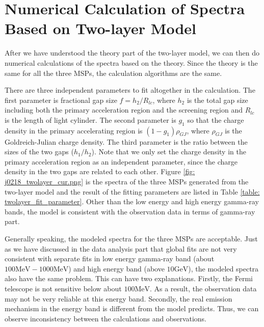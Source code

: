 \documentclass[12pt]{report}
\begin{document}
      

      \section{Numerical Calculation of Spectra Based on Two-layer Model}
        After we have understood the theory part of the two-layer model, 
        we can then do numerical calculations of the spectra 
        based on the theory. Since the theory is the same for all the three MSPs, the calculation 
        algorithms are the same. 

        There are three independent parameters to fit altogether in the calculation. 
        The first parameter is fractional gap size $f=h_{2}/R_{lc}$, where $h_{2}$ is the 
        total gap size including both the primary acceleration region and the screening region 
        and $R_{lc}$ is the length of light cylinder. The second parameter is $g_{1}$ so that
        the charge density in the primary accelerating region is $\left(1-g_{1}\right) \rho_{GJ}$, 
        where $\rho_{GJ}$ is the Goldreich-Julian charge density. The third parameter is the ratio 
        between the sizes of the two gaps ($h_{1}/h_{2}$). Note that we only set the charge density in the primary acceleration region as an 
        independent parameter, since the charge density in the two gaps are related to each 
        other. Figure \ref{fig: j0218_twolayer_cur.png} is the spectra of the three MSPs generated
        from the two-layer model and the result of the fitting parameters are listed in Table 
        \ref{table: twolayer_fit_parameter}. Other than the low energy and high energy gamma-ray bands, 
        the model is consistent with the observation data in terms of gamma-ray part. 

        Generally speaking, the modeled spectra for the three MSPs are acceptable. Just as 
        we have discussed in the data analysis part that global fits are not very consistent 
        with separate fits in low energy gamma-ray band (about $100\mbox{MeV} - 1000\mbox{MeV}$) and high energy
        band (above $10 \mbox{GeV}$), the modeled spectra also have the same problem. 
        This can have two explanations. Firstly, the Fermi telescope is not sensitive below 
        about $100 \mbox{MeV}$. As a result, the observation data may not be very reliable at  
        this energy band. Secondly, the real emission mechanism in the energy band is different 
        from the model predicts. Thus, we can observe inconsistency between the calculations 
        and observations.
 
\end{document}
